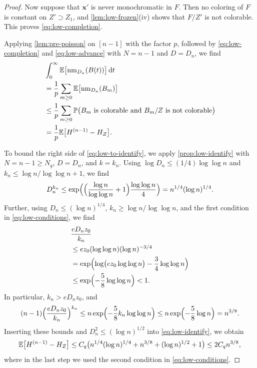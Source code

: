 \begin{proof}
Now suppose that $\mathbf x'$ is never monochromatic in $F$. Then no coloring of $F$ is constant on $Z' \supset Z_1$, and \cref{lem:low-frozen}(iv) shows that $F/Z'$ is not colorable. This proves \eqref{eq:low-completion}.

Applying \cref{lem:pre-poisson} on $[n - 1]$ with the factor $p$, followed by \eqref{eq:low-completion} and \eqref{eq:low-advance} with $N = n - 1$ and $D = D_n$, we find
\begin{equation}\label{eq:low-to-identify}
\begin{aligned}
&\int_0^\infty \mathbb E\bigl[\mathrm{nm}_{D_n}(B(t))\bigr] \,\mathrm d t \\
&= \frac{1}{p} \sum_{m \ge 0} \mathbb E\bigl[\mathrm{nm}_{D_n}(B_m)\bigr] \\
&\le \frac{1}{p} \sum_{m \ge 0} \mathbb P\bigl(B_m \text{ is colorable and } B_m/Z \text{ is not colorable}\bigr) \\
&= \frac{1}{p} \mathbb E\bigl[H^{(n - 1)} - H_Z\bigr].
\end{aligned}
\end{equation}

To bound the right side of \eqref{eq:low-to-identify}, we apply \cref{prop:low-identify} with $N = n - 1 \ge N_q$, $D = D_n$, and $k = k_n$. Using $\log D_n \le (1/4) \log \log n$ and $k_n \le \log n/\log \log n + 1$, we find
\begin{equation*}
D_n^{k_n} \le \exp\Bigl(\Bigl(\frac{\log n}{\log \log n} + 1\Bigr) \frac{\log \log n}{4}\Bigr) = n^{1/4} (\log n)^{1/4}.
\end{equation*}
Further, using $D_n \le (\log n)^{1/4}$, $k_n \ge \log n/\log \log n$, and the first condition in \eqref{eq:low-conditions}, we find
\begin{equation*}
\begin{aligned}
&\frac{e D_n z_0}{k_n} \\
&\le e z_0 (\log \log n) (\log n)^{-3/4} \\
&= \exp\Bigl(\log\bigl(e z_0 \log \log n\bigr) - \frac{3}{4} \log \log n\Bigr) \\
&\le \exp\Bigl(-\frac{5}{8} \log \log n\Bigr) < 1.
\end{aligned}
\end{equation*}
In particular, $k_n > e D_n z_0$, and
\begin{equation*}
(n - 1) \Bigl(\frac{e D_n z_0}{k_n}\Bigr)^{k_n} \le n \exp\Bigl(-\frac{5}{8} k_n \log \log n\Bigr) \le n \exp\Bigl(-\frac{5}{8} \log n\Bigr) = n^{3/8}.
\end{equation*}
Inserting these bounds and $D_n^2 \le (\log n)^{1/2}$ into \eqref{eq:low-identify}, we obtain
\begin{equation}\label{eq:low-advance-bound}
\mathbb E\bigl[H^{(n - 1)} - H_Z\bigr] \le C_q \bigl(n^{1/4} (\log n)^{1/4} + n^{3/8} + (\log n)^{1/2} + 1\bigr) \le 2 C_q n^{3/8},
\end{equation}
where in the last step we used the second condition in \eqref{eq:low-conditions}.


\end{proof}
